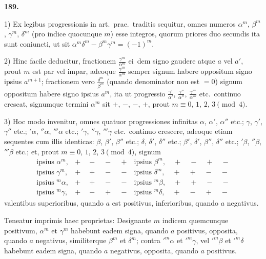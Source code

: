 \documentclass[12pt,a4paper]{article}
\theoremstyle{plain}
\begin{document}
\bigskip

\textbf{189.}

1) Ex legibus progressionis in art.~prae.~traditis sequitur, omnes numeros $\alpha^m$, $\beta^m$, $\gamma^m$, $\delta^m$ (pro indice quocunque $m$) esse integros, quorum priores duo secundis ita sunt coniuncti, ut sit $\alpha^m \delta^m - \beta^m \gamma^m = (-1)^m$.

2) Hinc facile deducitur, fractionem $\frac{\gamma^m}{\alpha^m}$ ei~dem signo gaudere atque $a$ vel $a'$, prout $m$ est par vel impar, adeoque $\frac{\gamma^m}{\alpha^m}$ semper signum habere oppositum signo ipsius $a^{m+1}$; fractionem vero $\frac{\delta^m}{\beta^m}$ (quando denominator non est $= 0$) signum oppositum habere signo ipsius $a^m$, ita ut progressio $\frac{\gamma'}{\alpha'}$, $\frac{\gamma''}{\alpha''}$, $\frac{\gamma'''}{\alpha'''}$ etc.~continuo crescat, signumque termini $\alpha^m$ sit $+$, $-$, $-$, $+$, prout $m \equiv 0$, $1$, $2$, $3 \pmod{4}$.

3) Hoc modo invenitur, omnes quatuor progressiones infinitas $\alpha$, $\alpha'$, $\alpha''$ etc.; $\gamma$, $\gamma'$, $\gamma''$ etc.; $'\alpha$, $''\alpha$, $'''\alpha$ etc.; $'\gamma$, $''\gamma$, $'''\gamma$ etc.~continuo crescere, adeoque etiam sequentes cum illis identicas: $\beta$, $\beta'$, $\beta''$ etc.; $\delta$, $\delta'$, $\delta''$ etc.; $\beta'$, $\delta'$, $\beta''$, $\delta''$ etc.; $'\beta$, $''\beta$, $'''\beta$ etc.; et, prout $m \equiv 0$, $1$, $2$, $3 \pmod{4}$, signum
\[
\begin{array}{c|c|c}
\text{ipsius } \alpha^m, & + \quad - \quad - \quad + & \text{ipsius } \beta^m, \quad + \quad - \quad + \quad - \\
\text{ipsius } \gamma^m, & + \quad + \quad - \quad - & \text{ipsius } \delta^m, \quad + \quad + \quad - \quad - \\
\text{ipsius } {}^m\alpha, & + \quad + \quad - \quad - & \text{ipsius } {}^m\beta, \quad + \quad + \quad - \quad - \\
\text{ipsius } {}^m\gamma, & + \quad - \quad + \quad - & \text{ipsius } {}^m\delta, \quad + \quad - \quad + \quad -
\end{array}
\]
valentibus superioribus, quando $a$ est positivus, inferioribus, quando $a$ negativus.

Teneatur imprimis haec proprietas: Designante $m$ indicem quemcunque positivum, $\alpha^m$ et $\gamma^m$ habebunt eadem signa, quando $a$ positivus, opposita, quando $a$ negativus, similiterque $\beta^m$ et $\delta^m$; contra $'^m\alpha$ et $'^m\gamma$, vel $'^m\beta$ et $'^m\delta$ habebunt eadem signa, quando $a$ negativus, opposita, quando $a$ positivus.
\end{document}
